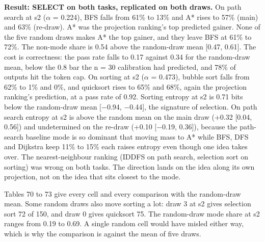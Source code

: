 \documentclass[11pt,letterpaper]{article}
\begin{document}
\textbf{Result: SELECT on both tasks, replicated on both draws.} On path search at s2 (\ensuremath{\alpha} = 0.224), BFS falls from 61\% to 13\% and A* rises to 57\% (main) and 63\% (re-draw). A* was the projection ranking's top predicted gainer. None of the five random draws makes A* the top gainer, and they leave BFS at 61\% to 72\%. The non-mode share is 0.54 above the random-draw mean [0.47, 0.61]. The cost is correctness: the pass rate falls to 0.17 against 0.34 for the random-draw mean, below the 0.8 bar the n = 30 calibration had predicted, and 78\% of outputs hit the token cap. On sorting at s2 (\ensuremath{\alpha} = 0.473), bubble sort falls from 62\% to 1\% and 0\%, and quicksort rises to 65\% and 68\%, again the projection ranking's prediction, at a pass rate of 0.92. Sorting entropy at s2 is 0.71 bits below the random-draw mean [\ensuremath{-}0.94, \ensuremath{-}0.44], the signature of selection. On path search entropy at s2 is above the random mean on the main draw (+0.32 [0.04, 0.56]) and undetermined on the re-draw (+0.10 [\ensuremath{-}0.19, 0.36]), because the path-search baseline mode is so dominant that moving mass to A* while BFS, DFS and Dijkstra keep 11\% to 15\% each raises entropy even though one idea takes over. The nearest-neighbour ranking (IDDFS on path search, selection sort on sorting) was wrong on both tasks. The direction lands on the idea along its own projection, not on the idea that sits closest to the mode.

Tables 70 to 73 give every cell and every comparison with the random-draw mean. Some random draws also move sorting a lot: draw 3 at s2 gives selection sort 72 of 150, and draw 0 gives quicksort 75. The random-draw mode share at s2 ranges from 0.19 to 0.69. A single random cell would have misled either way, which is why the comparison is against the mean of five draws.
\end{document}
